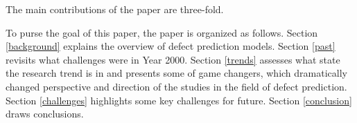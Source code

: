 The main contributions of the paper are three-fold.

\begin{itemize}
\end{itemize}

 To purse the goal of this paper, the paper is organized as follows. 
Section \ref{background} explains the overview of defect prediction models.
Section \ref{past} revisits what challenges were in Year 2000.
Section \ref{trends} assesses what state the research trend is in and presents some of game changers, which dramatically changed perspective and direction of the studies in the field of defect prediction.
Section \ref{challenges} highlights some key challenges for future.
Section \ref{conclusion} draws conclusions.
